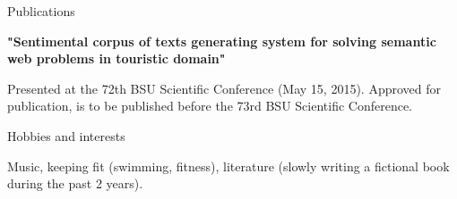 \documentclass{resume} %
\begin{document}
\begin{rSection}{Publications}

{\bf "Sentimental corpus of texts generating system for solving semantic web problems in touristic domain"}

Presented at the 72th BSU Scientific Conference (May 15, 2015). Approved for publication, is to be published before the 73rd BSU Scientific Conference.

\end{rSection}


\begin{rSection}{Hobbies and interests}

Music, keeping fit (swimming, fitness), literature (slowly writing a fictional book during the past 2 years).

\end{rSection}





\end{document}
